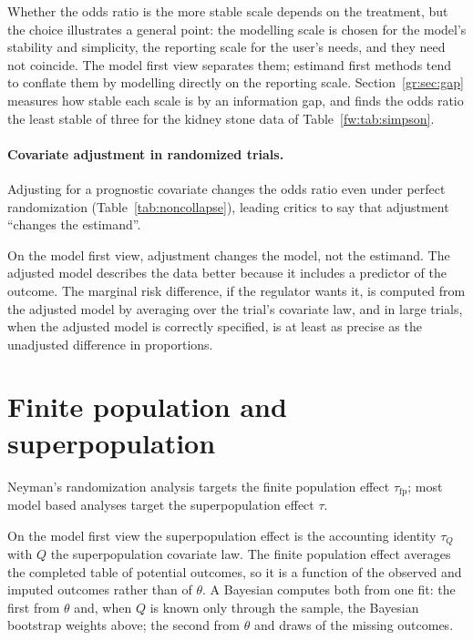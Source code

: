 Whether the odds ratio is the more stable scale depends on the treatment, but the choice illustrates a general point: the modelling scale is chosen for the model's stability and simplicity, the reporting scale for the user's needs, and they need not coincide. The model first view separates them; estimand first methods tend to conflate them by modelling directly on the reporting scale. Section~\ref{gr:sec:gap} measures how stable each scale is by an information gap, and finds the odds ratio the least stable of three for the kidney stone data of Table~\ref{fw:tab:simpson}.

\paragraph{Covariate adjustment in randomized trials.} Adjusting for a prognostic covariate changes the odds ratio even under perfect randomization (Table~\ref{tab:noncollapse}), leading critics to say that adjustment ``changes the estimand''.

On the model first view, adjustment changes the model, not the estimand. The adjusted model describes the data better because it includes a predictor of the outcome. The marginal risk difference, if the regulator wants it, is computed from the adjusted model by averaging over the trial's covariate law, and in large trials, when the adjusted model is correctly specified, is at least as precise as the unadjusted difference in proportions. 

\section{Finite population and superpopulation}

Neyman's randomization analysis targets the finite population effect $\tau_{\mathrm{fp}}$; most model based analyses target the superpopulation effect $\tau$.

On the model first view the superpopulation effect is the accounting identity $\tau_Q$ with $Q$ the superpopulation covariate law. The finite population effect averages the completed table of potential outcomes, so it is a function of the observed and imputed outcomes rather than of $\theta$. A Bayesian computes both from one fit: the first from $\theta$ and, when $Q$ is known only through the sample, the Bayesian bootstrap weights above; the second from $\theta$ and draws of the missing outcomes.

